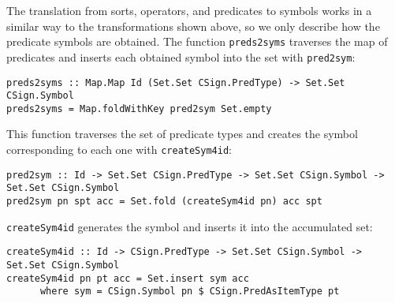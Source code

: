 The translation from sorts, operators, and predicates to symbols
works in a similar way to the transformations shown above, so we only
describe  how the predicate symbols are obtained. The function
\verb"preds2syms" traverses the map of predicates and inserts each
obtained symbol into the set with \verb"pred2sym":

{\codesize
\begin{verbatim}
preds2syms :: Map.Map Id (Set.Set CSign.PredType) -> Set.Set CSign.Symbol
preds2syms = Map.foldWithKey pred2sym Set.empty
\end{verbatim}
}

This function traverses the set of predicate types and creates the
symbol corresponding to each one with \verb"createSym4id":

{\codesize
\begin{verbatim}
pred2sym :: Id -> Set.Set CSign.PredType -> Set.Set CSign.Symbol -> Set.Set CSign.Symbol
pred2sym pn spt acc = Set.fold (createSym4id pn) acc spt
\end{verbatim}
}

\verb"createSym4id" generates the symbol and inserts it into the
accumulated set:

{\codesize
\begin{verbatim}
createSym4id :: Id -> CSign.PredType -> Set.Set CSign.Symbol -> Set.Set CSign.Symbol
createSym4id pn pt acc = Set.insert sym acc
      where sym = CSign.Symbol pn $ CSign.PredAsItemType pt
\end{verbatim}
}





















